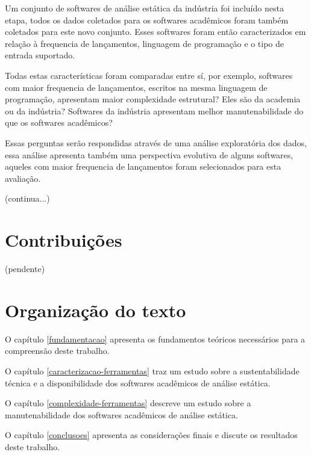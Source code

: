 Um conjunto de softwares de análise estática da indústria foi incluído nesta
etapa, todos os dados coletados para os softwares acadêmicos foram também
coletados para este novo conjunto. Esses softwares foram então caracterizados em
relação à frequencia de lançamentos, linguagem de programação e o tipo de
entrada suportado.

Todas estas características foram comparadas entre sí, por exemplo, softwares
com maior frequencia de lançamentos, escritos na mesma linguagem de
programação, apresentam maior complexidade estrutural? Eles são da academia ou
da indústria? Softwares da indústria apresentam melhor manutenabilidade do que
os softwares acadêmicos?

Essas perguntas serão respondidas através de uma análise exploratória dos
dados, essa análise apresenta também uma perspectiva evolutiva de alguns
softwares, aqueles com maior frequencia de lançamentos foram selecionados para
esta avaliação.

(continua...)

\section{Contribuições}

(pendente)

\section{Organização do texto}

O capítulo \ref{fundamentacao} apresenta os fundamentos teóricos necessários
para a compreensão deste trabalho.

O capítulo \ref{caracterizacao-ferramentas} traz um estudo sobre a
sustentabilidade técnica e a disponibilidade dos softwares acadêmicos de
análise estática.

O capítulo \ref{complexidade-ferramentas} descreve um estudo sobre a
manutenabilidade dos softwares acadêmicos de análise estática.

O capítulo \ref{conclusoes} apresenta as considerações finais e discute os
resultados deste trabalho.
